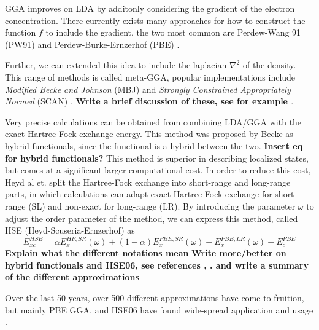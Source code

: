 GGA improves on LDA by additonly considering the gradient of the electron concentration. There currently exists many approaches for how to construct the function $f$ to include the gradient, the two most common are Perdew-Wang 91 (PW91) \cite{pw91} and Perdew-Burke-Ernzerhof (PBE) \cite{pbe}. 

Further, we can extended this idea to include the laplacian $\nabla^2$ of the density. This range of methods is called meta-GGA, popular implementations include \textit{Modified Becke and Johnson} (MBJ) \cite{mbj} and \textit{Strongly Constrained Appropriately Normed} (SCAN) \cite{scan}. \textbf{Write a brief discussion of these, see for example \cite{scan2}}.

Very precise calculations can be obtained from combining LDA/GGA with the exact Hartree-Fock exchange energy. This method was proposed by Becke as hybrid functionals, since the functional is a hybrid between the two. \textbf{Insert eq for hybrid functionals?} This method is superior in describing localized states, but comes at a significant larger computational cost. In order to reduce this cost, Heyd al et. split the Hartree-Fock exchange into short-range and long-range parts, in which calculations can adapt exact Hartree-Fock exchange for short-range (SL) and non-exact for long-range (LR). By introducing the parameter $\omega$ to adjust the order parameter of the method, we can express this method, called HSE (Heyd-Scuseria-Ernzerhof) \cite{hse06} as
\begin{equation}
    E_{xc}^{HSE} = \alpha E_{x}^{HF,SR}(\omega) + (1-\alpha)E_{x}^{PBE, SR}(\omega) + E_x^{PBE,LR}(\omega) + E_{c}^{PBE}
\end{equation}
\textbf{Explain what the different notations mean}
\textbf{Write more/better on hybrid functionals and HSE06, see references \cite{hf_bandgap}, \cite{hf_comparision}. \cite{hse} and write a summary of the different approximations}

Over the last 50 years, over 500 different approximations have come to fruition, but mainly PBE GGA, and HSE06 have found wide-spread application and usage \cite{xc_bandgap}.

